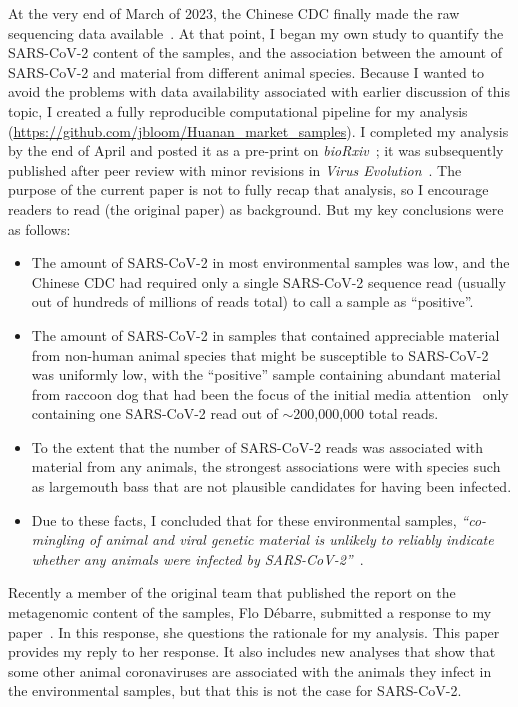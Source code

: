 \documentclass[9pt,twocolumn,twoside]{gsajnl_modified}
\begin{document}
At the very end of March of 2023, the Chinese CDC finally made the raw sequencing data available~\citep{liu2023surveillance-chinaxiv, liu2023surveillance}.
At that point, I began my own study to quantify the SARS-CoV-2 content of the samples, and the association between the amount of SARS-CoV-2 and material from different animal species.
Because I wanted to avoid the problems with data availability associated with earlier discussion of this topic, I created a fully reproducible computational pipeline for my analysis (\url{https://github.com/jbloom/Huanan_market_samples}).
I completed my analysis by the end of April and posted it as a pre-print on \textit{bioRxiv}~\citep{bloom2023biorxiv}; it was subsequently published after peer review with minor revisions in \textit{Virus Evolution}~\citep{bloom2023association}.
The purpose of the current paper is not to fully recap that analysis, so I encourage readers to read \citet{bloom2023association} (the original paper) as background.
But my key conclusions were as follows:
\begin{itemize}
\item The amount of SARS-CoV-2 in most environmental samples was low, and the Chinese CDC had required only a single SARS-CoV-2 sequence read (usually out of hundreds of millions of reads total) to call a sample as ``positive''.
\item The amount of SARS-CoV-2 in samples that contained appreciable material from non-human animal species that might be susceptible to SARS-CoV-2 was uniformly low, with the ``positive'' sample containing abundant material from raccoon dog that had been the focus of the initial media attention~\citep{wu2023atlantic, mueller2023nytimes} only containing one SARS-CoV-2 read out of $\sim$200,000,000 total reads.
\item To the extent that the number of SARS-CoV-2 reads was associated with material from any animals, the strongest associations were with species such as largemouth bass that are not plausible candidates for having been infected.
\item Due to these facts, I concluded that for these environmental samples, \textit{``co-mingling of animal and viral genetic material is unlikely to reliably indicate whether any animals were infected by SARS-CoV-2''}~\citep{bloom2023association}.
\end{itemize}

Recently a member of the original team that published the \citet{crits2023genetic} report on the metagenomic content of the samples, Flo D\'ebarre, submitted a response to my paper~\citep{debarre2024what}.
In this response, she questions the rationale for my analysis.
This paper provides my reply to her response.
It also includes new analyses that show that some other animal coronaviruses are associated with the animals they infect in the environmental samples, but that this is not the case for SARS-CoV-2.
\end{document}
